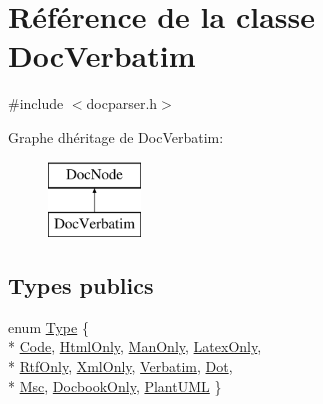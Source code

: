 \hypertarget{class_doc_verbatim}{}\section{Référence de la classe Doc\+Verbatim}
\label{class_doc_verbatim}


{\ttfamily \#include $<$docparser.\+h$>$}

Graphe d\textquotesingle{}héritage de Doc\+Verbatim\+:\begin{figure}[H]
\begin{center}
\leavevmode
\includegraphics[height=2.000000cm]{class_doc_verbatim}
\end{center}
\end{figure}
\subsection*{Types publics}
\begin{DoxyCompactItemize}
\item 
enum \hyperlink{class_doc_verbatim_ad8c770dcf2e62369b95f4e34fb11fa36}{Type} \{ \\*
\hyperlink{class_doc_verbatim_ad8c770dcf2e62369b95f4e34fb11fa36a5237d98c668e1c746648c77e62e18fe4}{Code}, 
\hyperlink{class_doc_verbatim_ad8c770dcf2e62369b95f4e34fb11fa36a8abc5ca69c3762e97cffaacc244457f1}{Html\+Only}, 
\hyperlink{class_doc_verbatim_ad8c770dcf2e62369b95f4e34fb11fa36a578f19d38fb29903c3f55aea4f76bccb}{Man\+Only}, 
\hyperlink{class_doc_verbatim_ad8c770dcf2e62369b95f4e34fb11fa36ac5a4818987c756de7d336c3d7ad04173}{Latex\+Only}, 
\\*
\hyperlink{class_doc_verbatim_ad8c770dcf2e62369b95f4e34fb11fa36a53b96b0c5ba74d8884669c178eb88bf9}{Rtf\+Only}, 
\hyperlink{class_doc_verbatim_ad8c770dcf2e62369b95f4e34fb11fa36ad30f4dea69d46825ffdf21d1748e3715}{Xml\+Only}, 
\hyperlink{class_doc_verbatim_ad8c770dcf2e62369b95f4e34fb11fa36a6c1b77a564f7f47346627a07de09c251}{Verbatim}, 
\hyperlink{class_doc_verbatim_ad8c770dcf2e62369b95f4e34fb11fa36a792fd26984aba5cab5b5bc235d705bd1}{Dot}, 
\\*
\hyperlink{class_doc_verbatim_ad8c770dcf2e62369b95f4e34fb11fa36aa841d77afafe62444561766f255fda8b}{Msc}, 
\hyperlink{class_doc_verbatim_ad8c770dcf2e62369b95f4e34fb11fa36a18bd2b8d2df70a8423919cf6dd4d33e1}{Docbook\+Only}, 
\hyperlink{class_doc_verbatim_ad8c770dcf2e62369b95f4e34fb11fa36a3291e7fae70d3ccc1ee0e306d7150012}{Plant\+U\+M\+L}
 \}
\end{DoxyCompactItemize}
